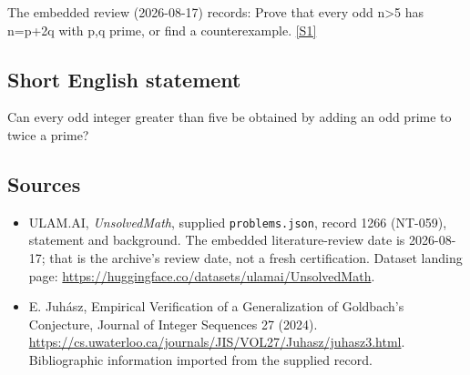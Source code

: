 \documentclass[11pt,a4paper]{article}
\newcommand{\sref}[2]{\hyperlink{source:#1:#2}{[S#2]}}
\begin{document}
The embedded review (2026-08-17) records: Prove that every odd n>5 has n=p+2q with p,q prime, or find a counterexample. \sref{1266}{1}

\subsection{Short English statement}

Can every odd integer greater than five be obtained by adding an odd prime to twice a prime?

\subsection{Sources}

{\small

\begin{itemize}

\item[\hypertarget{source:1266:1}{S1}] ULAM.AI, \emph{UnsolvedMath}, supplied \texttt{problems.json}, record 1266 (NT-059), statement and background. The embedded literature-review date is 2026-08-17; that is the archive’s review date, not a fresh certification. Dataset landing page: \url{https://huggingface.co/datasets/ulamai/UnsolvedMath}.

\item[\hypertarget{source:1266:2}{S2}] E. Juhász, Empirical Verification of a Generalization of Goldbach's Conjecture, Journal of Integer Sequences 27 (2024). \url{https://cs.uwaterloo.ca/journals/JIS/VOL27/Juhasz/juhasz3.html}. Bibliographic information imported from the supplied record.

\end{itemize}

}

\label{end:1266}
\end{document}
